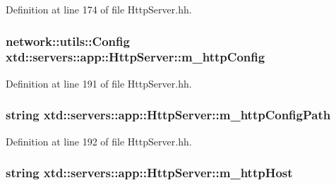 Definition at line 174 of file Http\-Server.\-hh.

\hypertarget{classxtd_1_1servers_1_1app_1_1HttpServer_ad5f2480d758b731b641e4858f556a3c3}{
\subsubsection[{m\-\_\-http\-Config}]{\setlength{\rightskip}{0pt plus 5cm}network\-::utils\-::\-Config xtd\-::servers\-::app\-::\-Http\-Server\-::m\-\_\-http\-Config\hspace{0.3cm}{\ttfamily [protected]}}}\label{classxtd_1_1servers_1_1app_1_1HttpServer_ad5f2480d758b731b641e4858f556a3c3}


Definition at line 191 of file Http\-Server.\-hh.

\hypertarget{classxtd_1_1servers_1_1app_1_1HttpServer_abfb9586e84fa5149da3226eeea39980f}{
\subsubsection[{m\-\_\-http\-Config\-Path}]{\setlength{\rightskip}{0pt plus 5cm}string xtd\-::servers\-::app\-::\-Http\-Server\-::m\-\_\-http\-Config\-Path\hspace{0.3cm}{\ttfamily [protected]}}}\label{classxtd_1_1servers_1_1app_1_1HttpServer_abfb9586e84fa5149da3226eeea39980f}


Definition at line 192 of file Http\-Server.\-hh.

\hypertarget{classxtd_1_1servers_1_1app_1_1HttpServer_af1676247676379d0c12008bdcd5b7e17}{
\subsubsection[{m\-\_\-http\-Host}]{\setlength{\rightskip}{0pt plus 5cm}string xtd\-::servers\-::app\-::\-Http\-Server\-::m\-\_\-http\-Host\hspace{0.3cm}{\ttfamily [protected]}}}\label{classxtd_1_1servers_1_1app_1_1HttpServer_af1676247676379d0c12008bdcd5b7e17}


